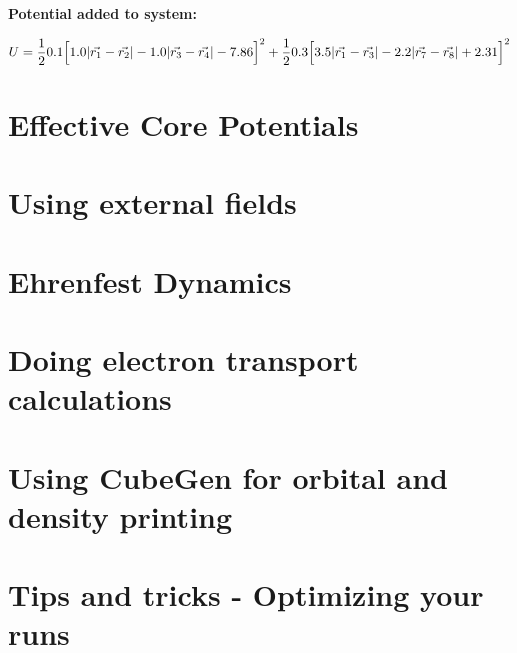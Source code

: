 \documentclass[journal=jctcce,manuscript=article]{achemso}
\begin{document}
    \textbf{Potential added to system:}

    \begin{equation}
      U=\frac{1}{2} 0.1 \Big{[} 1.0 |\vec{r_1} - \vec{r_2}| - 1.0 |\vec{r_3} - \vec{r_4}| - 7.86\Big{]}^2 + \frac{1}{2} 0.3 \Big{[} 3.5 |\vec{r_1} - \vec{r_3}| - 2.2 |\vec{r_7} - \vec{r_8}| +2.31\Big{]}^2 
      \label{Ex3}
    \end{equation}

\newpage
\section{Effective Core Potentials}

\newpage
\section{Using external fields}

\newpage
\section{Ehrenfest Dynamics}

\newpage
\section{Doing electron transport calculations}

\newpage
\section{Using CubeGen for orbital and density printing}

\newpage
\section{Tips and tricks - Optimizing your runs}
\end{document}
